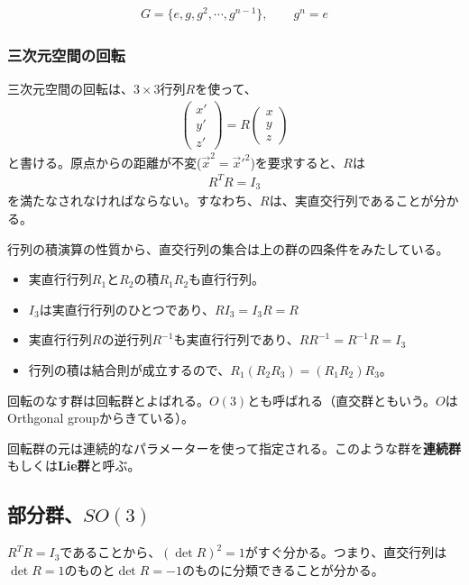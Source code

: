 \documentclass[10pt,a4paper]{jarticle}
\begin{document}
\begin{align}
G = \{e,g, g^2, \cdots, g^{n-1}\}, \qquad g^n = e
\end{align}



\subsubsection{三次元空間の回転}
三次元空間の回転は、$3\times 3$行列$R$を使って、
\begin{align}
\left(\begin{array}{c}
x' \\
y' \\
z'
\end{array}\right)
=
R
\left(\begin{array}{c}
x \\
y \\
z
\end{array}\right)
\end{align}
と書ける。原点からの距離が不変($\vec x^2 = \vec x'^2$)を要求すると、$R$は
\begin{align}
R^T R = I_3
\end{align}
を満たなされなければならない。すなわち、$R$は、実直交行列であることが分かる。

行列の積演算の性質から、直交行列の集合は上の群の四条件をみたしている。
\begin{itemize}
\item 実直行行列$R_1$と$R_2$の積$R_1 R_2$も直行行列。
\item $I_3$は実直行行列のひとつであり、$R I_3 = I_3 R = R$
\item 実直行行列$R$の逆行列$R^{-1}$も実直行行列であり、$R R^{-1} = R^{-1} R = I_3$
\item 行列の積は結合則が成立するので、$R_1 (R_2 R_3) = (R_1 R_2) R_3$。
\end{itemize}
回転のなす群は回転群とよばれる。$O(3)$とも呼ばれる（直交群ともいう。$O$はOrthgonal groupからきている）。

回転群の元は連続的なパラメーターを使って指定される。このような群を\textbf{連続群}もしくは\textbf{Lie群}と呼ぶ。

\subsection{部分群、$SO(3)$}
$R^T R = I_3$であることから、$(\det R)^2 = 1$がすぐ分かる。つまり、直交行列は$\det R=1$のものと$\det R=-1$のものに分類できることが分かる。
\end{document}

